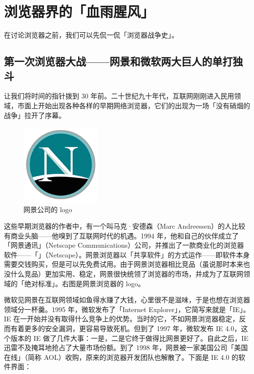 \section{浏览器界的「血雨腥风」}

在讨论浏览器之前，我们可以先侃一侃「浏览器战争史」。

\subsection[第一次浏览器大战——网景和微软两大巨人的单打独斗]{第一次浏览器大战{\normalsize ——网景和微软两大巨人的单打独斗}}

让我们将时间的指针拨到 30 年前。二十世纪九十年代，互联网刚刚进入民用领域，市面上开始出现各种各样的早期网络浏览器，它们的出现为一场「没有硝烟的战争」拉开了序幕。

\begin{figure}
  \centering
  \includegraphics[width=4cm]{assets/software/Netscape_logo.png}
  \caption{网景公司的 logo}
  \label{fig:Netscape_logo}
\end{figure}

这些早期浏览器的作者中，有一个叫马克·安德森（Marc Andreessen）的人比较有商业头脑——他嗅到了互联网时代的机遇。1994 年，他和自己的伙伴成立了「网景通讯」（Netscape Communications）公司，并推出了一款商业化的浏览器软件——「」（Netscape）。网景浏览器以「共享软件」的方式运作——即软件本身需要交钱购买，但是可以先免费试用。由于网景浏览器相比竞品（虽说那时本来也没什么竞品）更加实用、稳定，网景很快统领了浏览器的市场，并成为了互联网领域的「绝对标准」。右图是网景浏览器的 logo。

微软见网景在互联网领域如鱼得水赚了大钱，心里很不是滋味，于是也想在浏览器领域分一杯羹。1995 年，微软发布了「Internet Explorer」，它简写来就是「IE」。IE 在一开始并没有取得什么竞争上的优势。当时的它，不如网景浏览器稳定，反而有着更多的安全漏洞，更容易导致死机。但到了 1997 年，微软发布 IE 4.0，这个版本的 IE 做了几件大事：一是，二是它终于做得比网景更好了。自此之后，IE 迅雷不及掩耳地抢占了大量市场份额。到了 1998 年，网景被一家美国公司「美国在线」（简称 AOL）收购，原来的浏览器开发团队也解散了。下面是 IE 4.0 的软件界面：


